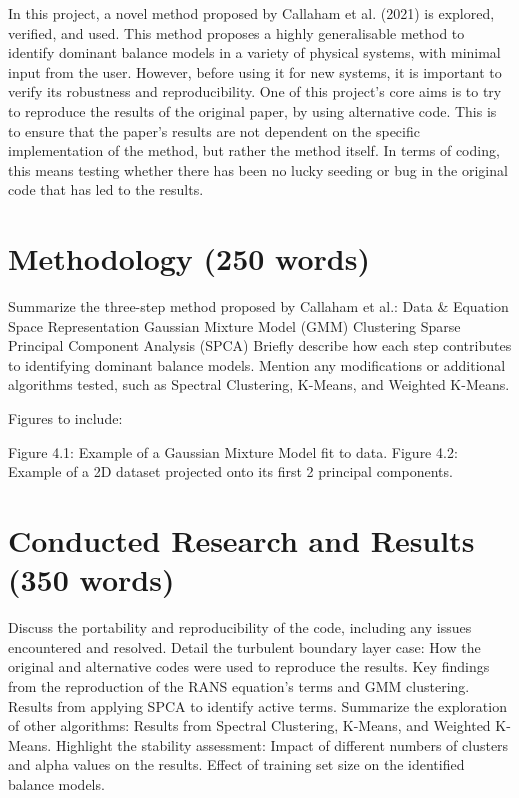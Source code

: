 \documentclass[12pt]{report} %
\begin{document}
\vspace{5mm}

In this project, a novel method proposed by Callaham et al. (2021)\cite{callaham2021learning} is explored, verified, and used. This method proposes a highly generalisable method to identify dominant balance models in a variety of physical systems, with minimal input from the user. However, before using it for new systems, it is important to verify its robustness and reproducibility. One of this project's core aims is to try to reproduce the results of the original paper, by using alternative code. This is to ensure that the paper's results are not dependent on the specific implementation of the method, but rather the method itself. In terms of coding, this means testing whether there has been no lucky seeding or bug in the original code that has led to the results.



\section{Methodology (250 words)}

Summarize the three-step method proposed by Callaham et al.:
Data \& Equation Space Representation
Gaussian Mixture Model (GMM) Clustering
Sparse Principal Component Analysis (SPCA)
Briefly describe how each step contributes to identifying dominant balance models.
Mention any modifications or additional algorithms tested, such as Spectral Clustering, K-Means, and Weighted K-Means.

Figures to include:

Figure 4.1: Example of a Gaussian Mixture Model fit to data.
Figure 4.2: Example of a 2D dataset projected onto its first 2 principal components.


\section{Conducted Research and Results (350 words)}

Discuss the portability and reproducibility of the code, including any issues encountered and resolved.
Detail the turbulent boundary layer case:
How the original and alternative codes were used to reproduce the results.
Key findings from the reproduction of the RANS equation’s terms and GMM clustering.
Results from applying SPCA to identify active terms.
Summarize the exploration of other algorithms:
Results from Spectral Clustering, K-Means, and Weighted K-Means.
Highlight the stability assessment:
Impact of different numbers of clusters and alpha values on the results.
Effect of training set size on the identified balance models.
\end{document}
